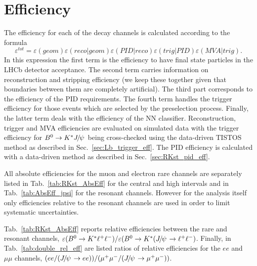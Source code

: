 \chapter{Efficiency}
\label{sec:RKst_efficiency}

The efficiency for each of the decay channels is calculated according to the formula
\begin{equation}
\varepsilon^{tot}=\varepsilon(geom)\varepsilon(reco|geom)\varepsilon(PID|reco)\varepsilon(trig|PID)\varepsilon(MVA|trig).
\end{equation}
In this expression the first term is the efficiency to have final state particles in the LHCb detector 
acceptance. The second term carries information on reconstruction and stripping efficiency
(we keep these together given that boundaries between them are completely artificial).
The third part corresponds to the efficiency of the PID requirements.
The fourth term handles the trigger efficiency for those events which are selected by the preselection process.
Finally, the latter term deals with the efficiency of the NN classifier.
Reconstruction, trigger and MVA efficiencies are evaluated on simulated data with the trigger efficiency
for $\Bz\to\Kstar\jpsi$ being cross-checked using the data-driven TISTOS method as described in Sec.~\ref{sec:Lb_trigger_eff}.
The PID efficiency is calculated with a data-driven method as described in Sec.~\ref{sec:RKst_pid_eff}.

All absolute efficiencies for the muon and electron rare channels are separately listed in Tab.~\ref{tab:RKst_AbsEff}
for the central and high \qsq intervals and in Tab.~\ref{tab:AbsEff_jpsi} for the resonant channels.
However for the analysis itself only efficiencies relative to the resonant channels are used in order
to limit systematic uncertainties.

Tab.~\ref{tab:RKst_AbsEff} reports relative efficiencies between the rare and resonant channels,
$\varepsilon(\Bz\to\Kstar \ell^+\ell^-)/\varepsilon(\Bz\to\Kstar(\jpsi\to \ell^+\ell^-)$.
Finally, in Tab.~\ref{tab:double_rel_eff} are listed ratios of relative efficiencies
for the $ee$ and $\mu\mu$ channels, $(ee/(\jpsi \to ee))/(\mumu/(\jpsi\to \mumu))$.

